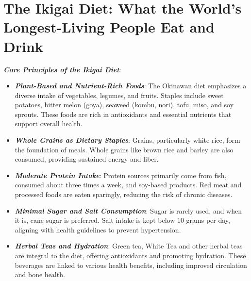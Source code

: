 \section*{The Ikigai Diet: What the World's Longest-Living People Eat and Drink}
\textbf{\textit{Core Principles of the Ikigai Diet}}:
\begin{itemize}
    \item \textbf{\textit{Plant-Based and Nutrient-Rich Foods}}: The Okinawan diet emphasizes a diverse intake of vegetables, legumes, and fruits. Staples include sweet potatoes, bitter melon (goya), seaweed (kombu, nori), tofu, miso, and soy sprouts. These foods are rich in antioxidants and essential nutrients that support overall health.
    \item \textbf{\textit{Whole Grains as Dietary Staples}}: Grains, particularly white rice, form the foundation of meals. Whole grains like brown rice and barley are also consumed, providing sustained energy and fiber.
    \item \textbf{\textit{Moderate Protein Intake}}: Protein sources primarily come from fish, consumed about three times a week, and soy-based products. Red meat and processed foods are eaten sparingly, reducing the risk of chronic diseases.
    \item \textbf{\textit{Minimal Sugar and Salt Consumption}}: Sugar is rarely used, and when it is, cane sugar is preferred. Salt intake is kept below 10 grams per day, aligning with health guidelines to prevent hypertension.
    \item \textbf{\textit{Herbal Teas and Hydration}}: Green tea, White Tea and other herbal teas are integral to the diet, offering antioxidants and promoting hydration. These beverages are linked to various health benefits, including improved circulation and bone health.
\end{itemize}
